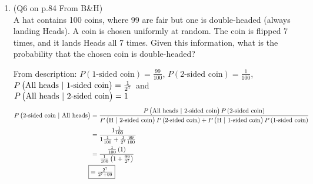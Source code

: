 \documentclass[11pt]{article}
\begin{document}
\begin{enumerate}
	\item (Q6 on p.84 From B\&H)\\
	A hat contains 100 coins, where 99 are fair but one is double-headed (always landing Heads). A coin is chosen uniformly at random. The coin is flipped 7 times, and it lands Heads all 7 times. Given this information, what is the probability that the chosen coin is double-headed?
		\begin{mdframed}
			From description: $ P\left( \text{1-sided coin} \right) = \frac{99}{100}$, $ P\left( \text{2-sided coin} \right) = \frac{1}{100} $, $ P\left( \text{All heads $ | $ 1-sided coin} \right) = \frac{1}{2^7}$ and \\
			$ P\left( \text{All heads $ | $ 2-sided coin} \right) = 1$
			\begin{align*}
				P\left( \text{2-sided coin $ | $ All heads} \right) &= \frac{P\left( \text{All heads $ | $ 2-sided coin} \right) P\left( \text{2-sided coin} \right)}{P\left( \text{H $ | $ 2-sided coin} \right) P\left( \text{2-sided coin} \right) + P\left( \text{H $ | $ 1-sided coin} \right)P\left( \text{1-sided coin} \right)}\\
				&= \frac{1 \frac{1}{100}}{1 \frac{1}{100} + \frac{1}{2^7}\frac{99}{100}}\\
				&= \frac{\frac{1}{100}\left( 1 \right)}{\frac{1}{100}\left( 1 + \frac{99}{2^7} \right)}\\
				\Aboxed{&= \tfrac{2^7}{2^7 + 99}}
			\end{align*}
		\end{mdframed}
\end{enumerate}
\end{document}
